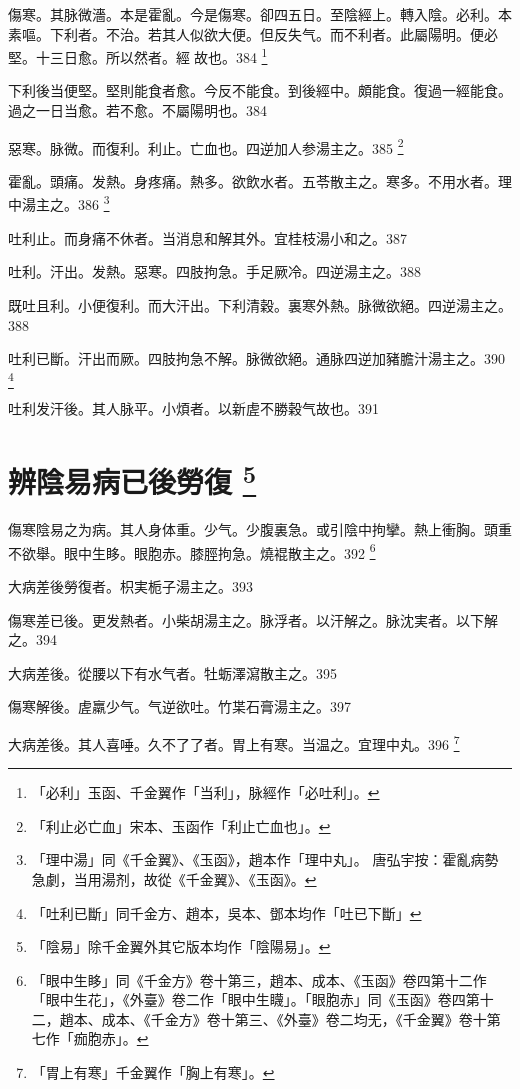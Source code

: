 傷寒。其脉微濇。本是霍亂。今是傷寒。卻四五日。至陰經上。轉入陰。必利。本素嘔。下利者。不治。若其人似欲大便。但反失气。而不利者。此屬陽明。便必堅。十三日愈。所以然者。經{\sungtpii 𥁞}故也。384
	\footnote{
	「必利」玉函、千金翼作「当利」，脉經作「必吐利」。
	}

下利後当便堅。堅則能食者愈。今反不能食。到後經中。頗能食。復過一經能食。過之一日当愈。若不愈。不屬陽明也。384

惡寒。脉微。而復利。利止。亡血也。四逆加人参湯主之。385
	\footnote{
	「利止必亡血」宋本、玉函作「利止亡血也」。
	}

霍亂。頭痛。发熱。身疼痛。熱多。欲飲水者。五苓散主之。寒多。不用水者。理中湯主之。386
	\footnote{
	「理中湯」同《千金翼》、《玉函》，趙本作「理中丸」。
	唐弘宇按：霍亂病勢急劇，当用湯剂，故從《千金翼》、《玉函》。
	}

吐利止。而身痛不休者。当消息和解其外。宜桂枝湯小和之。387

吐利。汗出。发熱。惡寒。四肢拘急。手足厥冷。四逆湯主之。388

既吐且利。小便復利。而大汗出。下利清穀。裏寒外熱。脉微欲絕。四逆湯主之。388

吐利已斷。汗出而厥。四肢拘急不解。脉微欲絕。通脉四逆加豬膽汁湯主之。390
	\footnote{
	「吐利已斷」同千金方、趙本，吳本、鄧本均作「吐已下斷」
	}

吐利发汗後。其人脉平。小煩者。以新虗不勝穀气故也。391

\chapter{辨陰易病已後勞復
	\footnote{
	「陰易」除千金翼外其它版本均作「陰陽易」。
	}
}

傷寒陰易之为病。其人身体重。少气。少腹裏急。或引陰中拘攣。熱上衝胸。頭重不欲舉。眼中生眵。{\khaaitp 眼胞赤。}膝脛拘急。燒裩散主之。392
	\footnote{
		「眼中生眵」同《千金方》卷十第三，趙本、成本、《玉函》卷四第十二作「眼中生花」，《外臺》卷二作「眼中生䁾」。「眼胞赤」同《玉函》卷四第十二，趙本、成本、《千金方》卷十第三、《外臺》卷二均无，《千金翼》卷十第七作「痂胞赤」。
	}

大病差後勞復者。枳実栀子湯主之。393

傷寒差已後。更发熱者。小柴胡湯主之。脉浮者。以汗解之。脉沈実者。以下解之。394

大病差後。從腰以下有水气者。牡蛎澤瀉散主之。395

傷寒解後。虗羸少气。气逆欲吐。竹枼石膏湯主之。397

大病差後。其人喜唾。久不了了者。胃上有寒。当温之。宜理中丸。396
	\footnote{
	「胃上有寒」千金翼作「胸上有寒」。
	}


